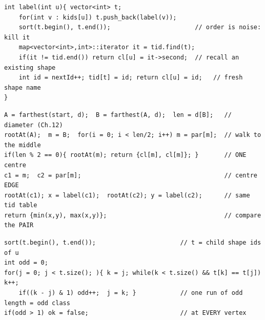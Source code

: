 \begin{lstlisting}[caption={Drill 1 -- the interned AHU labeller (from lst:c22-ahu)}]
int label(int u){ vector<int> t;
    for(int v : kids[u]) t.push_back(label(v));
    sort(t.begin(), t.end());                       // order is noise: kill it
    map<vector<int>,int>::iterator it = tid.find(t);
    if(it != tid.end()) return cl[u] = it->second;  // recall an existing shape
    int id = nextId++; tid[t] = id; return cl[u] = id;   // fresh shape name
}
\end{lstlisting}

\begin{lstlisting}[caption={Drill 2 -- centre form Phi of an unrooted tree (from lst:c22-unrooted)}]
A = farthest(start, d);  B = farthest(A, d);  len = d[B];   // diameter (Ch.12)
rootAt(A);  m = B;  for(i = 0; i < len/2; i++) m = par[m];  // walk to the middle
if(len % 2 == 0){ rootAt(m); return {cl[m], cl[m]}; }       // ONE centre
c1 = m;  c2 = par[m];                                       // centre EDGE
rootAt(c1); x = label(c1);  rootAt(c2); y = label(c2);      // same tid table
return {min(x,y), max(x,y)};                                // compare the PAIR
\end{lstlisting}

\begin{lstlisting}[caption={Drill 3 -- the mirror-symmetry test (from lst:c22-symmetree)}]
sort(t.begin(), t.end());                       // t = child shape ids of u
int odd = 0;
for(j = 0; j < t.size(); ){ k = j; while(k < t.size() && t[k] == t[j]) k++;
    if((k - j) & 1) odd++;  j = k; }            // one run of odd length = odd class
if(odd > 1) ok = false;                         // at EVERY vertex
\end{lstlisting}

